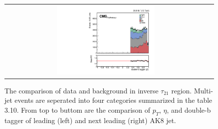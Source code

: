 \begin{figure}[t]
\begin{tabular}{cc}
    \includegraphics[width=0.5\textwidth]{Figures/dataMC_trig_antiTau21/doubleSV_j1.pdf} \\
  \end{tabular}
  \caption{The comparison of data and background in inverse $\tau _{21}$ region. Multi-jet events are seperated into four categories summarized in the table 3.10. From top to buttom are the comparison of $p_{T}$, $\eta $, and double-b tagger of leading (left) and next leading (right) AK8 jet.}
  \label{fig:hvt_brs}
\end{figure}
